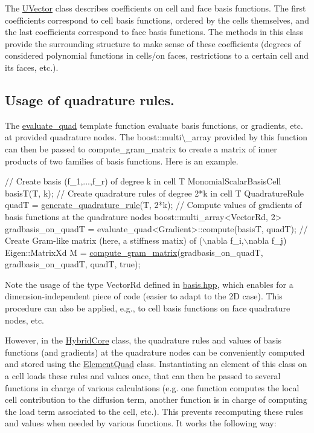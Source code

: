 The \hyperlink{classHArDCore3D_1_1UVector}{U\+Vector} class describes coefficients on cell and face basis functions. The first coefficients correspond to cell basis functions, ordered by the cells themselves, and the last coefficients correspond to face basis functions. The methods in this class provide the surrounding structure to make sense of these coefficients (degrees of considered polynomial functions in cells/on faces, restrictions to a certain cell and its faces, etc.).\hypertarget{index_usge_quad}{}\subsection{Usage of quadrature rules.}\label{index_usge_quad}
The \hyperlink{structHArDCore3D_1_1evaluate__quad}{evaluate\+\_\+quad} template function evaluate basis functions, or gradients, etc. at provided quadrature nodes. The {\ttfamily boost\+::multi\textbackslash{}\+\_\+array} provided by this function can then be passed to compute\+\_\+gram\+\_\+matrix to create a matrix of inner products of two families of basis functions. Here is an example.


\begin{DoxyCode}
\textcolor{comment}{// Create basis (f\_1,...,f\_r) of degree k in cell T}
MonomialScalarBasisCell basisT(T, k);
\textcolor{comment}{// Create quadrature rules of degree 2*k in cell T}
QuadratureRule quadT = \hyperlink{group__Quadratures_ga18d0a2cf574bef7d6e83760de2f38152}{generate\_quadrature\_rule}(T, 2*k);
\textcolor{comment}{// Compute values of gradients of basis functions at the quadrature nodes}
boost::multi\_array<VectorRd, 2> gradbasis\_on\_quadT = evaluate\_quad<Gradient>::compute(basisT, quadT);
\textcolor{comment}{// Create Gram-like matrix (here, a stiffness matix) of (\(\backslash\)nabla f\_i,\(\backslash\)nabla f\_j)}
Eigen::MatrixXd M = \hyperlink{group__Basis_gaf5cc3ed71949b5d7adc5877e6bfebcb4}{compute\_gram\_matrix}(gradbasis\_on\_quadT, gradbasis\_on\_quadT, quadT, \textcolor{keyword}{
      true});
\end{DoxyCode}


Note the usage of the type {\ttfamily Vector\+Rd} defined in {\ttfamily \hyperlink{basis_8hpp_source}{basis.\+hpp}}, which enables for a dimension-\/independent piece of code (easier to adapt to the 2D case). This procedure can also be applied, e.\+g., to cell basis functions on face quadrature nodes, etc.

However, in the \hyperlink{classHArDCore3D_1_1HybridCore}{Hybrid\+Core} class, the quadrature rules and values of basis functions (and gradients) at the quadrature nodes can be conveniently computed and stored using the \hyperlink{classHArDCore3D_1_1ElementQuad}{Element\+Quad} class. Instantiating an element of this class on a cell loads these rules and values once, that can then be passed to several functions in charge of various calculations (e.\+g. one function computes the local cell contribution to the diffusion term, another function is in charge of computing the load term associated to the cell, etc.). This prevents recomputing these rules and values when needed by various functions. It works the following way\+:


